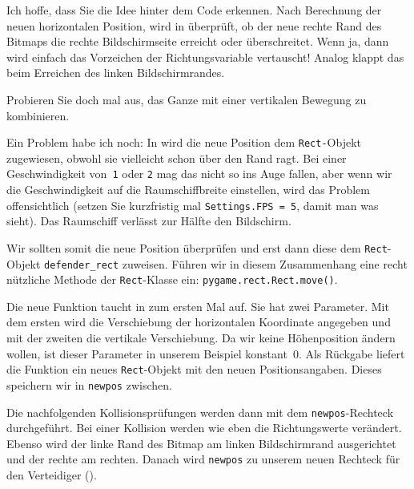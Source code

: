 
Ich hoffe, dass Sie die Idee hinter dem Code erkennen. Nach Berechnung der neuen horizontalen Position, wird in  überprüft, ob der neue rechte Rand des Bitmaps die rechte Bildschirmseite erreicht oder überschreitet. Wenn ja, dann wird einfach das Vorzeichen der Richtungsvariable vertauscht! Analog klappt das beim Erreichen des linken Bildschirmrandes. 


Probieren Sie doch mal aus, das Ganze mit einer vertikalen Bewegung zu kombinieren.

Ein Problem habe ich noch: In  wird die neue Position dem \texttt{Rect-}Objekt zugewiesen, obwohl sie vielleicht schon über den Rand ragt. Bei einer Geschwindigkeit von~\texttt{1} oder \texttt{2} mag das nicht so ins Auge fallen, aber wenn wir die Geschwindigkeit auf die Raumschiffbreite einstellen, wird das Problem offensichtlich (setzen Sie kurzfristig mal \texttt{Settings.FPS = 5}, damit man was sieht). Das Raumschiff verlässt zur Hälfte den Bildschirm. 

Wir sollten somit die neue Position überprüfen und erst dann diese dem \texttt{Rect}-Objekt \texttt{defender\_rect} zuweisen. Führen wir in diesem Zusammenhang eine recht nützliche Methode der \texttt{Rect}-Klasse ein: \texttt{pygame.rect.Rect.move()}.


Die neue Funktion taucht in  zum ersten Mal auf. Sie hat zwei Parameter. Mit dem ersten wird die Verschiebung der horizontalen Koordinate angegeben und mit der zweiten die vertikale Verschiebung. Da wir keine Höhenposition ändern wollen, ist dieser Parameter in unserem Beispiel konstant~0. Als Rückgabe liefert die Funktion ein neues \texttt{Rect}-Objekt mit den neuen Positionsangaben. Dieses speichern wir in \texttt{newpos} zwischen.

Die nachfolgenden Kollisionsprüfungen werden dann mit dem \texttt{newpos}-Rechteck durchgeführt. Bei einer Kollision werden wie eben die Richtungswerte verändert. Ebenso wird der linke Rand des Bitmap am linken Bildschirmrand ausgerichtet und der rechte am rechten. Danach wird \texttt{newpos} zu unserem neuen Rechteck für den Verteidiger ().


